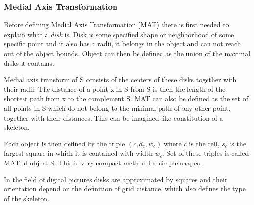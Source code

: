 \subsubsection{Medial Axis Transformation}
Before defining Medial Axis Transformation (MAT) there is first needed to explain what a \textit{disk} is.
Disk is some specified shape or neighborhood of some specific point and it also has a radii, it belongs in the object and can not reach out of the object bounds. Object can then be defined as the union of the maximal disks it contains.

Medial axis transform of S consists of the centers of these disks together with their radii. The distance of a point x in S from S is then the length of the shortest path from x to the complement S. MAT can also be defined as the set of all points in S which do not belong to the minimal path of any other point, together with their distances. This can be imagined like constitution of a skeleton.

Each object is then defined by the triple $(c, d_c, w_c)$ where $c$ is the cell, $s_c$ is the largest square in which it is contained with width $w_c$. Set of these triples is called MAT of object S. This is very compact method for simple shapes.

In the field of digital pictures disks are approximated by squares and their orientation depend on the definition of grid distance, which also defines the type of the skeleton.

